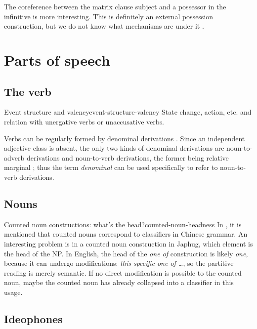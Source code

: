 \documentclass[a4paper, oneside, 12pt]{report}
\newcommand*{\citechap}[1]{Ch~{#1}}
\newcommand*{\citepage}[1]{p.~{#1}}
\newcommand*{\term}[1]{\emph{#1}}
\newcommand{\form}[1]{\emph{#1}}
\begin{document}
The coreference between the matrix clause subject and a possessor in the infinitive 
is more interesting.
This is definitely an external possession construction,
but we do not know what mechanisms are under it
\citep{deal2017external}.

\section{Parts of speech}

\subsection{The verb}

\begin{todobox}{Event structure and valency}{event-structure-valency}
    State change, action, etc. and relation with unergative verbs or unaccusative verbs.
\end{todobox}

Verbs can be regularly formed by denominal derivations
\citep[\citechap{20}]{jacques2021grammar}.
Since an independent adjective class is absent, 
the only two kinds of denominal derivations 
are noun-to-adverb derivations and noun-to-verb derivations,
the former being relative marginal \citep[\citepage{1011}]{jacques2021grammar};
thus the term \term{denominal} can be used specifically 
to refer to noun-to-verb derivations.

\subsection{Nouns}

\begin{todobox}{Counted noun constructions: what's the head?}{counted-noun-headness}
    In \citet[\citepage{10}]{jacques2021grammar},
    it is mentioned that counted nouns correspond to classifiers in Chinese grammar.
    An interesting problem is in a counted noun construction in Japhug,
    which element is the head of the NP.
    In English, the head of the \form{one of} construction is likely \form{one},
    because it can undergo modifications:
    \form{this specific one of \dots},
    so the partitive reading is merely semantic.
    If no direct modification is possible to the counted noun,
    maybe the counted noun has already collapsed into a classifier in this usage.
\end{todobox}

\subsection{Ideophones}
\end{document}
